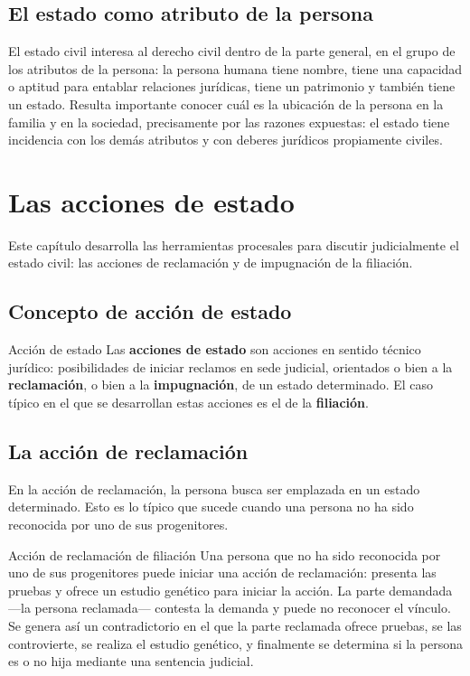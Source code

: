 \documentclass[12pt,oneside]{book}
\begin{document}
\section{El estado como atributo de la persona}

El estado civil interesa al derecho civil dentro de la parte general, en el grupo de los atributos de la persona: la persona humana tiene nombre, tiene una capacidad o aptitud para entablar relaciones jurídicas, tiene un patrimonio y también tiene un estado. Resulta importante conocer cuál es la ubicación de la persona en la familia y en la sociedad, precisamente por las razones expuestas: el estado tiene incidencia con los demás atributos y con deberes jurídicos propiamente civiles.

\chapter{Las acciones de estado}

Este capítulo desarrolla las herramientas procesales para discutir judicialmente el estado civil: las acciones de reclamación y de impugnación de la filiación.

\section{Concepto de acción de estado}

\begin{definition}{Acción de estado}
Las \textbf{acciones de estado} son acciones en sentido técnico jurídico: posibilidades de iniciar reclamos en sede judicial, orientados o bien a la \textbf{reclamación}, o bien a la \textbf{impugnación}, de un estado determinado. El caso típico en el que se desarrollan estas acciones es el de la \textbf{filiación}.
\end{definition}

\section{La acción de reclamación}

En la acción de reclamación, la persona busca ser emplazada en un estado determinado. Esto es lo típico que sucede cuando una persona no ha sido reconocida por uno de sus progenitores.

\begin{example}{Acción de reclamación de filiación}
Una persona que no ha sido reconocida por uno de sus progenitores puede iniciar una acción de reclamación: presenta las pruebas y ofrece un estudio genético para iniciar la acción. La parte demandada —la persona reclamada— contesta la demanda y puede no reconocer el vínculo. Se genera así un contradictorio en el que la parte reclamada ofrece pruebas, se las controvierte, se realiza el estudio genético, y finalmente se determina si la persona es o no hija mediante una sentencia judicial.
\end{example}
\end{document}
